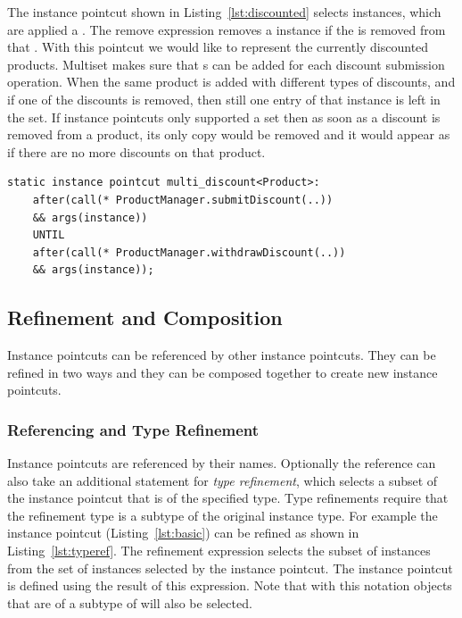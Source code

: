 The instance pointcut shown in Listing~\ref{lst:discounted} selects  instances, which are applied a . The remove expression removes a  instance if the  is removed from that . With this pointcut we would like to represent the currently discounted products. Multiset makes sure that s can be added for each discount submission operation. When the same product is added with different types of discounts, and if one of the discounts is removed, then still one entry of that instance is left in the set.  If instance pointcuts only supported a set then as soon as a discount is removed from a product, its only copy would be removed and it would appear as if there are no more discounts on that product.

\begin{lstlisting}[float=h!, caption={An instance pointcut utilizing multiset property}, label={lst:discounted}]
static instance pointcut multi_discount<Product>:
	after(call(* ProductManager.submitDiscount(..))
	&& args(instance))
	UNTIL
	after(call(* ProductManager.withdrawDiscount(..))
	&& args(instance));
\end{lstlisting}


\subsection{Refinement and Composition}

Instance pointcuts can be referenced by other instance pointcuts. They can be refined in two ways and they can be composed together to create new instance pointcuts.

\subsubsection{Referencing and Type Refinement}
\label{sect:typeref}
Instance pointcuts are referenced by their names. Optionally the reference can also take an additional statement for \emph{type refinement}, which selects a subset of the instance pointcut that is of the specified type. Type refinements require that the refinement type is a subtype of the original instance type. For example the instance pointcut  (Listing~\ref{lst:basic}) can be refined as shown in Listing~\ref{lst:typeref}. The refinement expression selects the subset of  instances from the set of  instances selected by the  instance pointcut. The  instance pointcut is defined using the result of this expression. Note that with this notation objects that are of a subtype of  will also be selected.

